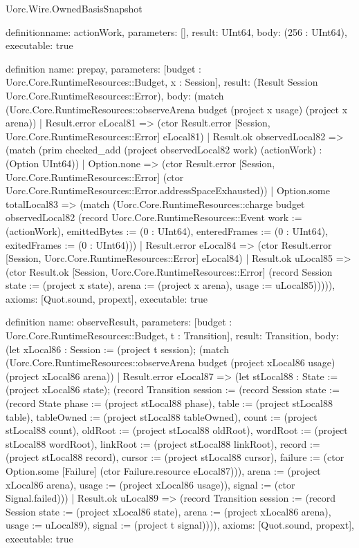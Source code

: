 \begin{lexlean}{Uorc.Wire.OwnedBasisSnapshot}
\begin{semanticmodule}
definition{name: actionWork, parameters: [], result: UInt64, body: (256 : UInt64), executable: true}

definition{
  name: prepay,
  parameters: [budget : Uorc.Core.RuntimeResources::Budget, x : Session],
  result: (Result Session Uorc.Core.RuntimeResources::Error),
  body: (match (Uorc.Core.RuntimeResources::observeArena budget (project x usage) (project x arena))
    | Result.error eLocal81 => (ctor Result.error [Session, Uorc.Core.RuntimeResources::Error] eLocal81)
    | Result.ok observedLocal82 => (match (prim checked_add (project observedLocal82 work) (actionWork) : (Option UInt64))
      | Option.none => (ctor Result.error [Session, Uorc.Core.RuntimeResources::Error] (ctor Uorc.Core.RuntimeResources::Error.addressSpaceExhausted))
      | Option.some totalLocal83 => (match (Uorc.Core.RuntimeResources::charge budget observedLocal82 (record Uorc.Core.RuntimeResources::Event {work := (actionWork), emittedBytes := (0 : UInt64), enteredFrames := (0 : UInt64), exitedFrames := (0 : UInt64)}))
        | Result.error eLocal84 => (ctor Result.error [Session, Uorc.Core.RuntimeResources::Error] eLocal84)
        | Result.ok uLocal85 => (ctor Result.ok [Session, Uorc.Core.RuntimeResources::Error] (record Session {state := (project x state), arena := (project x arena), usage := uLocal85}))))),
  axioms: [Quot.sound, propext],
  executable: true
}

definition{
  name: observeResult,
  parameters: [budget : Uorc.Core.RuntimeResources::Budget, t : Transition],
  result: Transition,
  body: (let xLocal86 : Session := (project t session); (match (Uorc.Core.RuntimeResources::observeArena budget (project xLocal86 usage) (project xLocal86 arena))
    | Result.error eLocal87 => (let stLocal88 : State := (project xLocal86 state); (record Transition {session := (record Session {state := (record State {phase := (project stLocal88 phase), table := (project stLocal88 table), tableOwned := (project stLocal88 tableOwned), count := (project stLocal88 count), oldRoot := (project stLocal88 oldRoot), wordRoot := (project stLocal88 wordRoot), linkRoot := (project stLocal88 linkRoot), record := (project stLocal88 record), cursor := (project stLocal88 cursor), failure := (ctor Option.some [Failure] (ctor Failure.resource eLocal87))}), arena := (project xLocal86 arena), usage := (project xLocal86 usage)}), signal := (ctor Signal.failed)}))
    | Result.ok uLocal89 => (record Transition {session := (record Session {state := (project xLocal86 state), arena := (project xLocal86 arena), usage := uLocal89}), signal := (project t signal)}))),
  axioms: [Quot.sound, propext],
  executable: true
}


\end{semanticmodule}
\end{lexlean}
